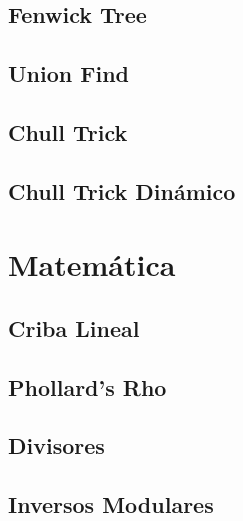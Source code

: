 \documentclass[a4paper,11pt,landscape,twocolumn]{article}
\begin{document}


\subsection{Fenwick Tree}



\subsection{Union Find}



\subsection{Chull Trick}



\subsection{Chull Trick Dinámico}



\section{Matemática}

\subsection{Criba Lineal}



\subsection{Phollard's Rho}



\subsection{Divisores}



\subsection{Inversos Modulares}
\end{document}
